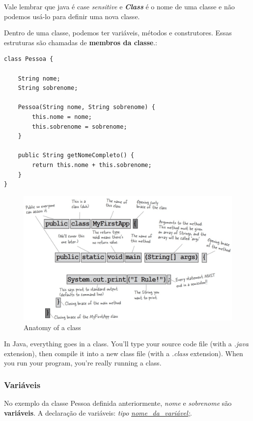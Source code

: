 \documentclass[12pt]{article}
\begin{document}
Vale lembrar que java é case \textit{sensitive} e \textbf{\textit{Class}} é o nome de uma classe e não podemos usá-lo para definir uma nova classe.
\pagebreak

Dentro de uma classe, podemos ter variáveis, métodos e construtores. Essas estruturas são chamadas de \textbf{membros da classe}.:

\begin{lstlisting}
class Pessoa {
	
	String nome;
	String sobrenome;
	
	Pessoa(String nome, String sobrenome) {
		this.nome = nome;
		this.sobrenome = sobrenome;
	}
	
	public String getNomeCompleto() {
		return this.nome + this.sobrenome;
	}
}	
\end{lstlisting}

\begin{figure}[H]
	\centering
	\includegraphics[width=1\linewidth]{figuras/class}
	\caption[Anatomy of a class]{Anatomy of a class}
	\label{fig:class}
\end{figure}

In Java, everything goes in a class. You’ll type your source code file (with a \textit{.java} extension), then compile it into a new class file (with a \textit{.class} extension). When you run your program, you’re really running a class.


\subsubsection{Variáveis}

No exemplo da classe Pessoa definida anteriormente, \textit{nome} e \textit{sobrenome} são \textbf{variáveis}. A declaração de variáveis: \textit{tipo} \textit{\underline{nome\_da\_variável;}}.
\end{document}
